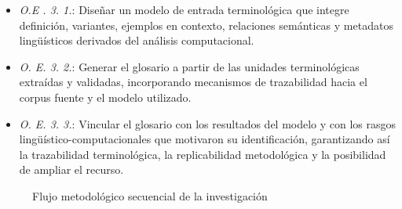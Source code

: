 \begin{itemize}
    \begin{itemize}
        \item \textit{O.E . 3. 1.}: Diseñar un modelo de entrada terminológica que integre definición, variantes, ejemplos en contexto, relaciones semánticas y metadatos lingüísticos derivados del análisis computacional.
        \item \textit{O. E. 3. 2.}: Generar el glosario a partir de las unidades terminológicas extraídas y validadas, incorporando mecanismos de trazabilidad hacia el corpus fuente y el modelo utilizado.
        \item \textit{O. E. 3. 3.}:  Vincular el glosario con los resultados del modelo y con los rasgos lingüístico-computacionales que motivaron su identificación, garantizando así la trazabilidad terminológica, la replicabilidad metodológica y la posibilidad de ampliar el recurso.
    \end{itemize}
\end{itemize}

\begin{figure}[H]
\centering
{}
\caption{Flujo metodológico secuencial de la investigación}
\label{fig:flujo_simple_colores}
\end{figure}

